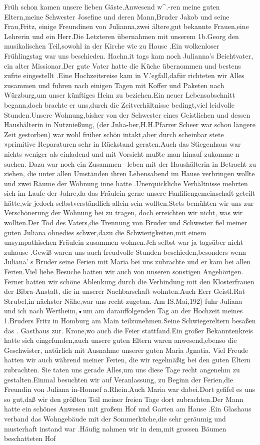 \documentclass[a4paper,11pt]{article}
\begin{document}
   Früh schon kamen unsere lieben Gäste.Anwesend w^.-ren meine guten Eltern,meine Schwester Josefine und deren Mann,Bruder Jakob und seine Frau,Fritz, einige Freundinen von Julianna,zwei ältere,gut bekannte Frauen,eine Lehrerin und ein Herr.Die Letzteren übernahmen mit unserem 1b.Georg den musikalischen Teil,sowohl in der Kirche wie zu Hause .Ein wolkenloser Frühlingstag war uns beschieden. Hachn.it tags kam noch Julianna’s Beichtvater, ein alter Missionar.Der gute Vater hatte die Küche übernommen und bestens zufrie eingestellt .Eine Hochzeitsreise kam in V.'egfall,dafür richteten wir Alles zusammen und fuhren nach einigen Tagen mit Koffer und Paketen nach Würzburg,um unser künftiges Heim zu beziehen.Ein neuer Lebensabschnitt begann,doch brachte er uns,durch die Zeitverhältnisse bedingt,viel leidvolle Stunden.Unsere Wohnung,bisher von der Schwester eines Geistlichen und dessen Haushälterin in Nutznießung, (der Jnha-ber,H.H.Pfarrer Scheer war schon längere Zeit gestorben) war wohl früher schön intakt,aber durch scheinbar stete »primitive Reparaturen sehr in Rückstand geraten.Auch das Stiegenhaus war nichts weniger als einladend und mit Vorsicht mußte man hinauf zukomme n suchen. Dazu war noch ein Zusammen-- leben mit der Haushälterin in Betracht zu ziehen, die unter allen Umständen ihren Lebensabend im Hause verbringen wollte und zwei Räume der Wohnung inne hatte .Unerquickliche Verhältnisse mehrten sich im Laufe der Jahre,da das Fräulein gerne unsere Fanliliengemeinschaft geteilt hätte,wir jedoch selbstverständlich allein sein wollten.Stets bemühten wir uns zur Verschönerung der Wohnung bei zu tragen, doch erreichten wir nicht, was wir wollten.Der Tod des Vaters,die Trennung von Bruder und Schwester fiel meiner guten Juliana ohnedies schwer,dazu die Schwierigkeiten,mit einem unsympathischen Fräulein zusammen wohnen.Jch selbst war ja tagsüber nicht zuhause .Gewiß waren uns auch freudvolle Stunden beschieden,besonders wenn Juliana' s Bruder seine Ferien mit Maria bei uns zubrachte und er kam bei allen Ferien.Viel liebe Besuche hatten wir auch von unseren sonstigen Angehörigen. Ferner hatten wir schöne Ablenkung durch die Verbindung mit den Klosterfrauen der Bibra-Anstalt, die in unserer Nachbarschaft wohnten.Auch Eerr Geistl.Rat Strubel,in nächster Nähe,war uns recht zugetan.-Am IS.Mai,192) fuhr Juliana und ich nach Wertheim,•um am darauffolgenden Tag an der Hochzeit meines 1.Bruders Fritz in Homburg am Main teilzunehmen.Seine Schwiegereltern besaßen das . Gasthaus zur. Krone,wo auch die Feier stattfand.Ein großer Bekanntenkreis hatte sich eingefunden,auch unsere guten Eltern waren anwesend,ebenso die Geschwister, natürlich mit Ausnahme unserer guten Maria Jgnatia. Viel Freude hatten wir auch während meiner Ferien, die wir regelmäßig bei den guten Eltern zubrachten. Sie taten uns gerade Alles,um uns diese Tage recht angenehm zu gestalten.Einmal besuchten wir auf Veranlassung, zu Beginn der Ferien,die Freundin von Juliana in-Honnef a.Rhein.Auch Maria war dabei.Dort gefifel es uns so gut,daß wir den größten Teil meiner freien Tage dort zubrachten.Der Mann hatte ein schönes Anwesen mit großem Hof und Garten am Hause .Ein Glashaus verband das Wohngebäude mit der Sommerküche,die sehr geräumig und musterhaft instand war .Häufig nahmen wir in dem,mit grossen Bäumen beschatteten Hof 
\end{document}
